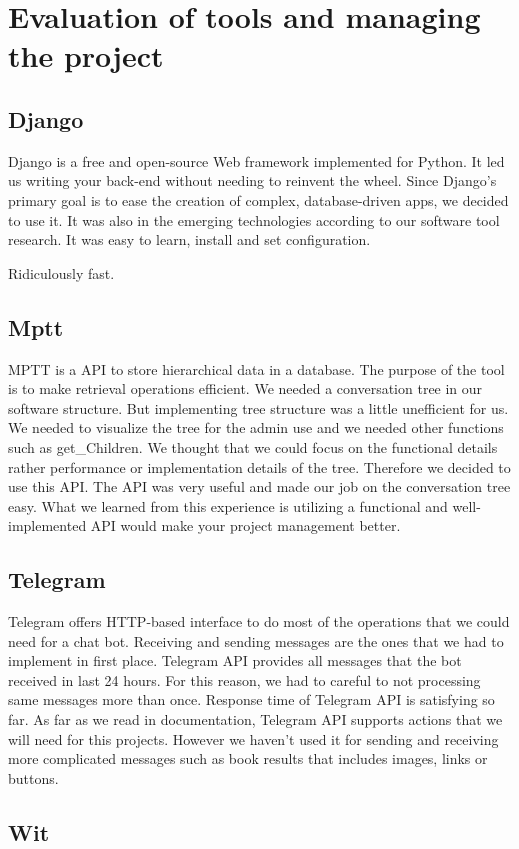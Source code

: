 \documentclass[a4paper]{article}
\begin{document}
\section{Evaluation of tools and managing the project}
\subsection{Django}
Django is a free and open-source Web framework implemented for Python. It led us writing your back-end without needing to reinvent the wheel. Since Django's primary goal is to ease the creation of complex, database-driven apps, we decided to use it. It was also in the emerging technologies according to our software tool research. It was easy to learn, install and set configuration.

Ridiculously fast.
\subsection{Mptt}
MPTT is a API to store hierarchical data in a database. The purpose of the tool is to make retrieval operations efficient. We needed a conversation tree in our software structure. But implementing tree structure was a little unefficient for us. We needed to visualize the tree for the admin use and we needed other functions such as get\_Children. We thought that we could focus on the functional details rather performance or implementation details of the tree. Therefore we decided to use this API. The API was very useful and made our job on the conversation tree easy. What we learned from this experience is utilizing a functional and well-implemented API would make your project management better.

\subsection{Telegram}
Telegram offers HTTP-based interface to do most of the operations that we could need for a chat bot. Receiving and sending messages are the ones that we had to implement in first place. Telegram API provides all messages that the bot received in last 24 hours. For this reason, we had to careful to not processing same messages more than once. Response time of Telegram API is satisfying so far. As far as we read in documentation, Telegram API supports actions that we will need for this projects. However we haven't used it for sending and receiving more complicated messages such as book results that includes images, links or buttons. 
\subsection{Wit}
\end{document}
